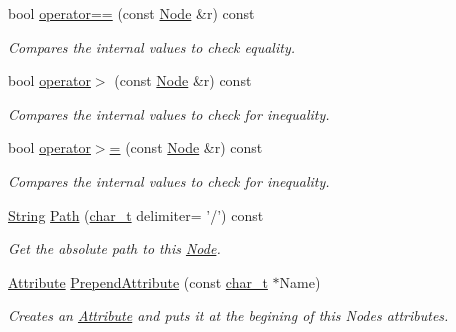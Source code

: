 \begin{DoxyCompactItemize}
bool \hyperlink{classphys_1_1xml_1_1Node_a5ae85504c26f8494c0ba048dc2370ac2}{operator==} (const \hyperlink{classphys_1_1xml_1_1Node}{Node} \&r) const 
\begin{DoxyCompactList}\small\item\em Compares the internal values to check equality. \item\end{DoxyCompactList}\item 
bool \hyperlink{classphys_1_1xml_1_1Node_a7fc3bf84e390269a115e546babf89dfd}{operator$>$} (const \hyperlink{classphys_1_1xml_1_1Node}{Node} \&r) const 
\begin{DoxyCompactList}\small\item\em Compares the internal values to check for inequality. \item\end{DoxyCompactList}\item 
bool \hyperlink{classphys_1_1xml_1_1Node_a444f80194136237ebc7c971b1c837155}{operator$>$=} (const \hyperlink{classphys_1_1xml_1_1Node}{Node} \&r) const 
\begin{DoxyCompactList}\small\item\em Compares the internal values to check for inequality. \item\end{DoxyCompactList}\item 
\hyperlink{namespacephys_1_1xml_a4d8ca7638328d16d303e5a4c849f4704}{String} \hyperlink{classphys_1_1xml_1_1Node_a0bf85dc0820ba204e7c9498c6651aec8}{Path} (\hyperlink{namespacephys_1_1xml_afc87705cd1c2917d87b879715a2d8f6e}{char\_\-t} delimiter= '/') const 
\begin{DoxyCompactList}\small\item\em Get the absolute path to this \hyperlink{classphys_1_1xml_1_1Node}{Node}. \item\end{DoxyCompactList}\item 
\hyperlink{classphys_1_1xml_1_1Attribute}{Attribute} \hyperlink{classphys_1_1xml_1_1Node_aa64f2de951032177731e8cba7282529d}{PrependAttribute} (const \hyperlink{namespacephys_1_1xml_afc87705cd1c2917d87b879715a2d8f6e}{char\_\-t} $\ast$Name)
\begin{DoxyCompactList}\small\item\em Creates an \hyperlink{classphys_1_1xml_1_1Attribute}{Attribute} and puts it at the begining of this Nodes attributes. \item\end{DoxyCompactList}\item 

\end{DoxyCompactItemize}
